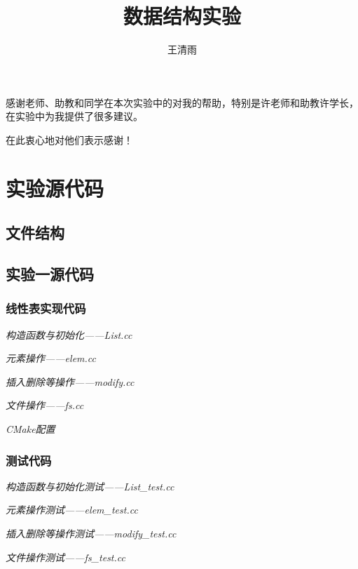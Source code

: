 \documentclass[format=draft,language=chinese,category=academic-report]{hustreport}
\title{数据结构实验}
\author{王清雨}
\begin{document}
\frontmatter
\maketitle
\makeabstract
\tableofcontents
\mainmatter

\backmatter

\begin{ack}
    感谢老师、助教和同学在本次实验中的对我的帮助，特别是许老师和助教许学长，在实验中为我提供了很多建议。
    \par
    在此衷心地对他们表示感谢！
\end{ack}



\appendix

\chapter{实验源代码}\label{appendix:1}
\section{文件结构}\label{appendix:structure}

\section{实验一源代码}\label{appendix:lab1}
\subsection{线性表实现代码}
\emph{构造函数与初始化——List.cc}

\emph{元素操作——elem.cc}

\emph{插入删除等操作——modify.cc}

\emph{文件操作——fs.cc}

\emph{CMake配置}

\subsection{测试代码}\label{appendix:test1}
\emph{构造函数与初始化测试——List\_test.cc}

\emph{元素操作测试——elem\_test.cc}

\emph{插入删除等操作测试——modify\_test.cc}

\emph{文件操作测试——fs\_test.cc}

\end{document}
